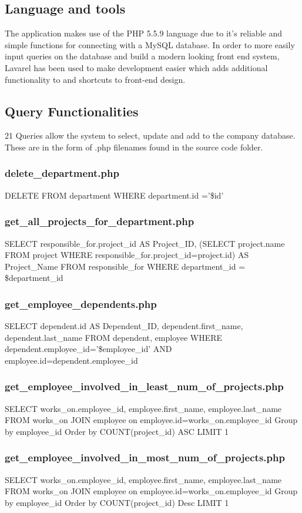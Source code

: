 \documentclass[11pt,letterpaper]{article}
\begin{document}
\subsection{Language and tools}
	The application makes use of the PHP 5.5.9 language due to it's reliable and simple functions for connecting with a MySQL database. In order to more easily input queries on the database and build a modern looking front end system, Lavarel has been used to make development easier which adds additional functionality to and shortcuts to front-end design.\\

\subsection{Query Functionalities}
	21 Queries allow the system to select, update and add to the company database. These are in the form of .php filenames found in the source code folder.
	\subsubsection{delete\_department.php}
	DELETE FROM department WHERE department.id ='\$id'
	\subsubsection{get\_all\_projects\_for\_department.php}
	SELECT responsible\_for.project\_id AS Project\_ID, (SELECT project.name FROM project WHERE responsible\_for.project\_id=project.id) AS Project\_Name FROM responsible\_for WHERE department\_id = \$department\_id
	\subsubsection{get\_employee\_dependents.php}
	SELECT dependent.id AS Dependent\_ID, dependent.first\_name, dependent.last\_name FROM dependent, employee WHERE dependent.employee\_id='\$employee\_id' AND employee.id=dependent.employee\_id
	\subsubsection{get\_employee\_involved\_in\_least\_num\_of\_projects.php}
	SELECT works\_on.employee\_id, employee.first\_name, employee.last\_name
	FROM works\_on
	JOIN employee
	on employee.id=works\_on.employee\_id
	Group by employee\_id
	Order by COUNT(project\_id) ASC
	LIMIT 1
	\subsubsection{get\_employee\_involved\_in\_most\_num\_of\_projects.php}
	SELECT works\_on.employee\_id, employee.first\_name, employee.last\_name
	FROM works\_on
	JOIN employee
	on employee.id=works\_on.employee\_id
	Group by employee\_id
	Order by COUNT(project\_id) Desc
	LIMIT 1
\end{document}
